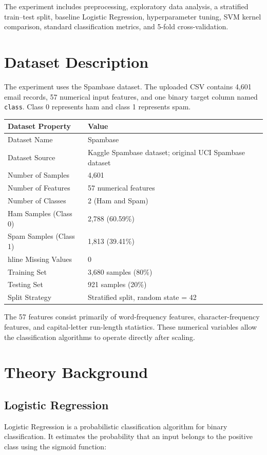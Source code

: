 \documentclass[12pt,a4paper]{article}
\begin{document}
The experiment includes preprocessing, exploratory data analysis, a stratified train--test split, baseline Logistic Regression, hyperparameter tuning, SVM kernel comparison, standard classification metrics, and 5-fold cross-validation.

\section{Dataset Description}
The experiment uses the Spambase dataset. The uploaded CSV contains 4,601 email records, 57 numerical input features, and one binary target column named \texttt{class}. Class 0 represents ham and class 1 represents spam.

\begin{longtable}{|p{6cm}|p{8cm}|}
\hline
\textbf{Dataset Property} & \textbf{Value} \\ \hline
Dataset Name & Spambase \\ \hline
Dataset Source & Kaggle Spambase dataset; original UCI Spambase dataset \\ \hline
Number of Samples & 4,601 \\ \hline
Number of Features & 57 numerical features \\ \hline
Number of Classes & 2 (Ham and Spam) \\ \hline
Ham Samples (Class 0) & 2,788 (60.59\%) \\ \hline
Spam Samples (Class 1) & 1,813 (39.41\%) \\hline
Missing Values & 0 \\ \hline
Training Set & 3,680 samples (80\%) \\ \hline
Testing Set & 921 samples (20\%) \\ \hline
Split Strategy & Stratified split, random state = 42 \\ \hline
\end{longtable}

The 57 features consist primarily of word-frequency features, character-frequency features, and capital-letter run-length statistics. These numerical variables allow the classification algorithms to operate directly after scaling.

\section{Theory Background}

\subsection{Logistic Regression}
Logistic Regression is a probabilistic classification algorithm for binary classification. It estimates the probability that an input belongs to the positive class using the sigmoid function:
\end{document}

